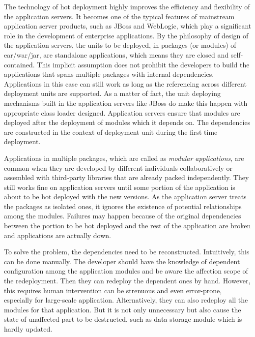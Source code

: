 \documentclass[conference]{IEEEtran}
\begin{document}
The technology of hot deployment highly improves the efficiency and flexibility of the application servers.
It becomes one of the typical features of mainstream application server products, such as JBoss\cite{jboss} and WebLogic\cite{weblogic}, which play a significant role in the development of enterprise applications. By the philosophy of design of the application servers, the units to be deployed, in packages (or modules) of ear/war/jar, are standalone applications, which means they are closed and self-contained. This implicit assumption does not prohibit the developers to build the applications that spans multiple packages with internal dependencies. Applications in this case can still work as long as the referencing across different deployment units are supported. As a matter of fact, the unit deploying mechanisms built in the application servers like JBoss do make this happen with appropriate class loader designed. Application servers ensure that modules are deployed after the deployment of modules which it depends on. The dependencies are constructed in the context of deployment unit during the first time deployment.

Applications in multiple packages, which are called as \emph{modular applications}, are common when they are developed by different individuals collaboratively or assembled with third-party libraries that are already packed independently. They still works fine on application servers until some portion of the application is about to be hot deployed  with the new versions. As the application server treats the packages as isolated ones, it ignores the existence of potential relationships among the modules. Failures may happen because of the original dependencies between the portion to be hot deployed and the rest of the application are broken and applications are actually down.

To solve the problem, the dependencies need to be reconstructed. Intuitively, this can be done manually. The developer should have the knowledge of dependent configuration among the application modules and be aware the affection scope of the redeployment. Then they can redeploy the dependent ones by hand. However, this requires human intervention can be strenuous and even error-prone, especially for large-scale application. Alternatively, they can also redeploy all the modules for that application. But it is not only unnecessary but also cause the state of unaffected part to be destructed, such as data storage module which is hardly updated. 
\end{document}
